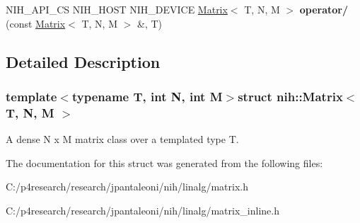 \begin{DoxyCompactItemize}
\item 
\hypertarget{group__linalg_ga24d2f0d22492f9e3d3807af392e5fd12}{
\-N\-I\-H\-\_\-\-A\-P\-I\-\_\-\-C\-S \-N\-I\-H\-\_\-\-H\-O\-S\-T \-N\-I\-H\-\_\-\-D\-E\-V\-I\-C\-E \*
\hyperlink{structnih_1_1_matrix}{\-Matrix}$<$ \-T, \-N, \-M $>$ {\bfseries operator/} (const \hyperlink{structnih_1_1_matrix}{\-Matrix}$<$ \-T, \-N, \-M $>$ \&, \-T)}
\label{group__linalg_ga24d2f0d22492f9e3d3807af392e5fd12}

\end{DoxyCompactItemize}


\subsection{\-Detailed \-Description}
\subsubsection*{template$<$typename \-T, int \-N, int \-M$>$struct nih\-::\-Matrix$<$ T, N, M $>$}

\-A dense \-N x \-M matrix class over a templated type \-T. 

\-The documentation for this struct was generated from the following files\-:\begin{DoxyCompactItemize}
\item 
\-C\-:/p4research/research/jpantaleoni/nih/linalg/matrix.\-h\item 
\-C\-:/p4research/research/jpantaleoni/nih/linalg/matrix\-\_\-inline.\-h\end{DoxyCompactItemize}
